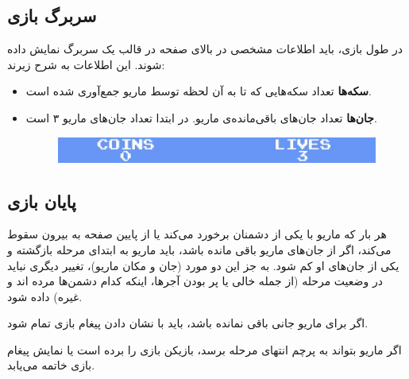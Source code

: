 \documentclass{utap}
\begin{document}
	\subsection{سربرگ‌ بازی}

در طول بازی، باید اطلاعات مشخصی در بالای صفحه در قالب یک سربرگ نمایش داده شوند. این اطلاعات به شرح زیرند:
	\begin{itemize}
		\item
\textbf{سکه‌ها}
تعداد سکه‌هایی که تا به آن لحظه توسط ماریو جمع‌آوری شده است.
		\item
\textbf{جان‌ها}
تعداد جان‌های باقی‌مانده‌ی ماریو. در ابتدا تعداد جان‌های ماریو  ۳ است.
	\begin{figure}[H]
	\begin{center}
		\includegraphics[width=\textwidth]{header}
	\end{center}
\end{figure}

	\end{itemize}

	\subsection{پایان بازی}
هر بار که ماریو با یکی از دشمنان برخورد می‌کند یا از پایین صفحه به بیرون سقوط می‌کند،  اگر از جان‌های ماریو باقی مانده باشد، باید ماریو به ابتدای مرحله بازگشته و یکی از جان‌های او کم شود. به جز این دو مورد (جان و مکان ماریو)، تغییر دیگری نباید در وضعیت مرحله (از جمله خالی یا پر بودن آجر‌ها، اینکه کدام دشمن‌ها مرده اند و غیره) داده شود.

اگر برای ماریو جانی باقی نمانده باشد، باید با نشان دادن پیغام  بازی تمام شود.

اگر ماریو بتواند به پرچم انتهای مرحله برسد، بازیکن بازی را برده است یا نمایش پیغام  بازی خاتمه می‌یابد.
\end{document}
